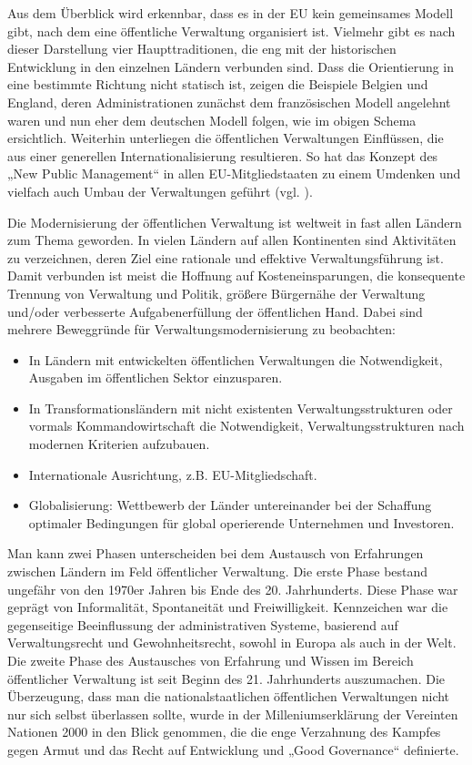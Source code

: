 Aus dem Überblick wird erkennbar, dass es in der EU kein gemeinsames Modell gibt, nach dem eine öffentliche Verwaltung organisiert ist. Vielmehr gibt es nach dieser Darstellung vier Haupttraditionen, die eng mit der historischen Entwicklung in den einzelnen Ländern verbunden sind. Dass die Orientierung in eine bestimmte Richtung nicht statisch ist, zeigen die Beispiele Belgien und England, deren Administrationen zunächst dem französischen Modell angelehnt waren und nun eher dem deutschen Modell folgen, wie im obigen Schema ersichtlich. Weiterhin unterliegen die öffentlichen Verwaltungen Einflüssen, die aus einer generellen Internationalisierung resultieren. So hat das Konzept des „New Public Management“ in allen EU-Mitgliedstaaten zu einem Umdenken und vielfach auch Umbau der Verwaltungen geführt (vgl. \cite{dunhoo}).
\par
Die Modernisierung der öffentlichen Verwaltung ist weltweit in fast allen Ländern zum Thema geworden. In vielen Ländern auf allen Kontinenten sind Aktivitäten zu verzeichnen, deren Ziel eine rationale und effektive Verwaltungsführung ist. Damit verbunden ist meist die Hoffnung auf Kosteneinsparungen, die konsequente Trennung von Verwaltung und Politik, größere Bürgernähe der Verwaltung und/oder verbesserte Aufgabenerfüllung der öffentlichen Hand. Dabei sind mehrere Beweggründe für Verwaltungsmodernisierung zu beobachten:
\par
\begin{itemize} \itemsep1pt \parskip0pt 
\item In Ländern mit entwickelten öffentlichen Verwaltungen die Notwendigkeit, Ausgaben im öffentlichen Sektor einzusparen.
\item In Transformationsländern mit nicht existenten Verwaltungsstrukturen oder vormals Kommandowirtschaft die Notwendigkeit, Verwaltungsstrukturen nach modernen Kriterien aufzubauen.
\item Internationale Ausrichtung, z.B. EU-Mitgliedschaft.
\item Globalisierung: Wettbewerb der Länder untereinander bei der Schaffung optimaler Bedingungen für global operierende Unternehmen und Investoren.
\end{itemize}
Man kann zwei Phasen unterscheiden bei dem Austausch von Erfahrungen zwischen Ländern im Feld öffentlicher Verwaltung. Die erste Phase bestand ungefähr von den 1970er Jahren bis Ende des 20. Jahrhunderts. Diese Phase war geprägt von Informalität, Spontaneität und Freiwilligkeit. Kennzeichen war die gegenseitige Beeinflussung der administrativen Systeme, basierend auf Verwaltungsrecht und Gewohnheitsrecht, sowohl in Europa als auch in der Welt. Die zweite Phase des Austausches von Erfahrung und Wissen im Bereich öffentlicher Verwaltung ist seit Beginn des 21. Jahrhunderts auszumachen. Die Überzeugung, dass man die nationalstaatlichen öffentlichen Verwaltungen nicht nur sich selbst überlassen sollte, wurde in der Milleniumserklärung der Vereinten Nationen 2000 in den Blick genommen, die die enge Verzahnung des Kampfes gegen Armut und das Recht auf Entwicklung und „Good Governance“ definierte. 
